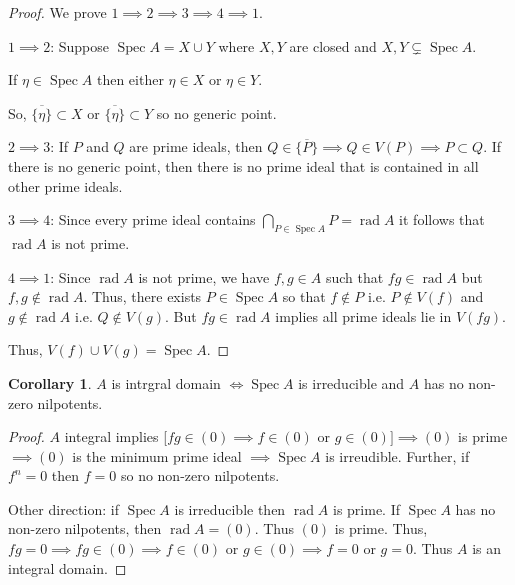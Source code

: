 \documentclass{article}
\theoremstyle{definition}
\newtheorem{corollary}[theorem]{Corollary}
\begin{document}
    \begin{proof}
        We prove \(1 \implies 2 \implies 3 \implies 4 \implies 1\).

        \(1 \implies 2\): Suppose \(\operatorname{Spec} A = X \cup Y\) where \(X,Y\) are closed and \(X,Y \subsetneq \operatorname{Spec} A\).

        If \(\eta \in \operatorname{Spec} A\) then either \(\eta \in X\) or \(\eta \in Y\).

        So, \(\overline{\{ \eta \}} \subset X\) or \(\overline{\{ \eta \} } \subset Y\) so no generic point.
        
        \(2 \implies 3\): If \(P\) and \(Q\) are prime ideals, then \(Q \in \overline{\{ P \}} \implies Q \in V(P) \implies P \subset Q\). If there is no generic point, then there is no prime ideal that is contained in all other prime ideals.
        
        \(3 \implies 4\): Since every prime ideal contains \(\bigcap_{P\in \operatorname{Spec} A} P = \operatorname{rad} A\) it follows that \(\operatorname{rad} A\) is not prime.

        \(4 \implies 1\): Since \(\operatorname{rad} A\) is not prime, we have \(f,g\in A\) such that \(fg\in \operatorname{rad} A\) but \(f,g\notin \operatorname{rad} A\). Thus, there exists \(P\in \operatorname{Spec} A\) so that \(f\notin P\) i.e. \(P \notin V(f)\) and \(g\notin \operatorname{rad} A\) i.e. \(Q \notin V(g)\). But \(fg\in \operatorname{rad} A\) implies all prime ideals lie in \(V(fg)\).

        Thus, \(V(f) \cup V(g) = \operatorname{Spec} A\).
    \end{proof}

    \begin{corollary}
        \(A\) is intrgral domain \(\iff \operatorname{Spec} A\) is irreducible and \(A\) has no non-zero nilpotents.
    \end{corollary}

    \begin{proof}
        \(A\) integral implies [\(fg\in (0) \implies f\in (0)\) or \(g\in (0)] \implies (0)\) is prime \(\implies (0)\) is the minimum prime ideal \(\implies \operatorname{Spec} A\) is irreudible. Further, if \(f^n = 0\) then \(f=0\) so no non-zero nilpotents.

        Other direction: if \(\operatorname{Spec} A\) is irreducible then \(\operatorname{rad} A\) is prime. If \(\operatorname{Spec} A\) has no non-zero nilpotents, then \(\operatorname{rad} A = (0)\). Thus \((0)\) is prime. Thus, \(fg = 0 \implies fg\in (0) \implies f \in (0)\) or \(g\in (0) \implies f=0\) or \(g=0\). Thus \(A\) is an integral domain.
    \end{proof}
\end{document}
